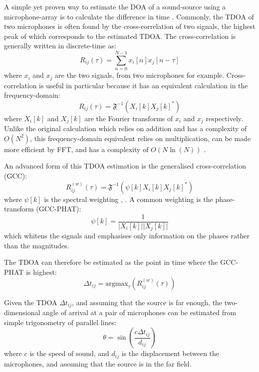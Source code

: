 \documentclass[notitlepage]{report}
\begin{document}
A simple yet proven way to estimate the DOA of a sound-source using a microphone-array is to calculate the difference in time \cite{argentieri_survey_2015}. Commonly, the TDOA of two microphones is often found by the cross-correlation of two signals, the highest peak of which corresponds to the estimated TDOA. The cross-correlation is generally written in discrete-time as:
\begin{equation}
R_{ij}(\tau) = \sum_{n=0}^{N-1} x_i[n]x_j[n-\tau]
\end{equation}
where $x_i$ and $x_j$ are the two signals, from two microphones for example. Cross-correlation is useful in particular because it has an equivalent calculation in the frequency-domain:
\begin{equation}
R_{ij}(\tau) = \mathfrak{F}^{-1} \left( X_i[k]X_j[k]^* \right)
\end{equation}
where $X_i[k]$ and $X_j[k]$ are the Fourier transforms of $x_i$ and $x_j$ respectively. Unlike the original calculation which relies on addition and has a complexity of $O(N^2)$, this frequency-domain equivalent relies on multiplication, can be made more efficient by FFT, and has a complexity of $O\left(N\ln(N)\right)$ \cite{valin_robust_2003}.

An advanced form of this TDOA estimation is the generalised cross-correlation (GCC):
\begin{equation}
R^{(w)}_{ij}(\tau) = \mathfrak{F}^{-1} \left( \psi[k]X_i[k]X_j[k]^* \right)
\end{equation}
where $\psi[k]$ is the spectral weighting \cite{argentieri_survey_2015}, \cite{rascon_localization_2017}. A common weighting is the phase-transform (GCC-PHAT):
\begin{equation}
\psi[k] = \frac{1}{\lvert X_i[k] \rvert \lvert X_j[k] \rvert}
\end{equation}
which whitens the signals and emphasises only information on the phases rather than the magnitudes.

The TDOA can therefore be estimated as the point in time where the GCC-PHAT is highest:
\begin{equation}
\Delta t_{ij} = \text{argmax}_\tau \left( R^{(w)}_{ij} (\tau) \right)
\end{equation}

Given the TDOA $\Delta t_{ij}$, and assuming that the source is far enough, the two-dimensional angle of arrival at a pair of microphones can be estimated from simple trigonometry of parallel lines:
\begin{equation}
\theta = \sin\left( \frac{c\Delta t_{ij}}{d_{ij}} \right)
\end{equation}
where $c$ is the speed of sound, and $d_{ij}$ is the displacement between the microphones, and assuming that the source is in the far field.
\end{document}
